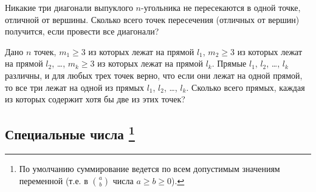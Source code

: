 \begin{problems}
\item
Никакие три диагонали выпуклого $n$-угольника не пересекаются в одной точке,
отличной от вершины.
Сколько всего точек пересечения (отличных от вершин) получится, если провести
все диагонали?

\item
Дано $n$ точек,
$m_1 \geq 3$ из которых лежат на прямой $l_1$,
$m_2 \geq 3$ из которых лежат на прямой $l_2$,
\ldots,
$m_k \geq 3$ из которых лежат на прямой $l_k$.
Прямые $l_1$, $l_2$, \ldots, $l_k$ различны, и для любых трех точек верно, что
если они лежат на одной прямой, то все три лежат на одной из прямых
$l_1$, $l_2$, \ldots, $l_k$.
Сколько всего прямых, каждая из которых содержит хотя бы две из этих точек?

\end{problems}

\subsection*{Специальные числа%
\footnote{По умолчанию суммирование ведется по всем допустимым значениям
переменной
(т.е. в ${\binom{a}{b}}$ числа $a \geq b \geq 0$).}}

\newcommand{\ds}{\displaystyle}

